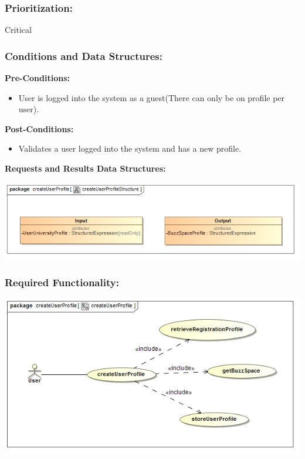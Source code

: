 \documentclass[a4paper,11pt]{article}
\begin{document}
\subsubsection{Prioritization:} 
\textbf{}Critical
\subsubsection{Conditions and Data Structures:}
\textbf{Pre-Conditions:}
\begin{itemize}
\item User is logged into the system as a guest(There can only be on profile per user). 
\end{itemize}
\textbf{Post-Conditions:}
\begin{itemize}
\item Validates a user logged into the system and has a new profile.
\end{itemize}
\textbf{Requests and Results Data Structures:}
\begin{center}
\includegraphics[width=1\linewidth]{./Images/UserProfile/CreateUserProfileStructure}
\end{center}
\subsubsection{Required Functionality:} 
\includegraphics[width=1\linewidth]{./Images/UserProfile/CreateUserProfileUseCase}
\end{document}
